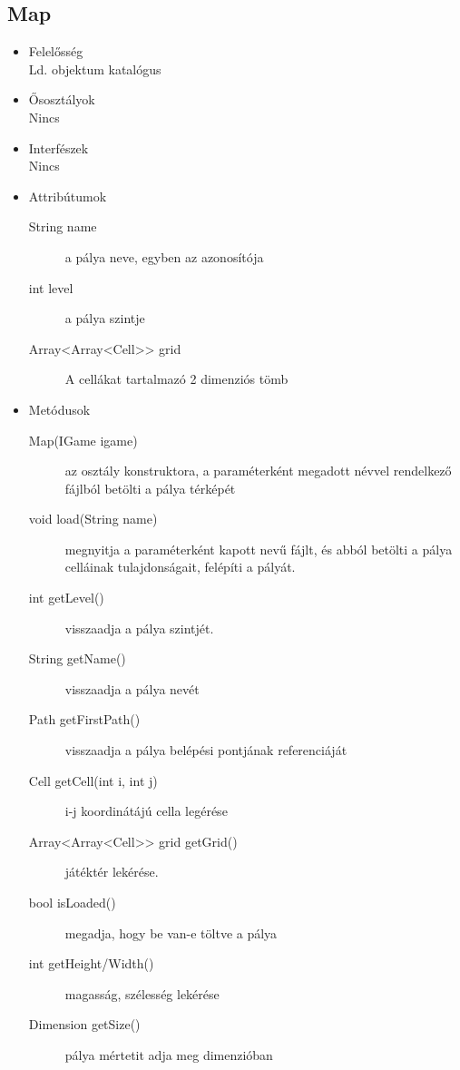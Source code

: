 \subsection{Map}
\begin{itemize}
\item Felelősség\\
Ld. objektum katalógus
\item Ősosztályok\\
Nincs
\item Interfészek\\
Nincs
\item Attribútumok\\
	\begin{description}
		\item[String name] a pálya neve, egyben az azonosítója
		\item[int level] a pálya szintje
		\item[Array<Array<Cell>> grid] A cellákat tartalmazó 2 dimenziós tömb

		
	\end{description}
\item Metódusok\\
	\begin{description}
		
		\item[Map(IGame igame)] az osztály konstruktora, a paraméterként megadott névvel rendelkező fájlból betölti a pálya térképét
\item[void load(String name)] megnyitja a paraméterként kapott nevű fájlt, és abból betölti a pálya celláinak tulajdonságait, felépíti a pályát.
\item[int getLevel()] visszaadja a pálya szintjét.
\item[String getName()] visszaadja a pálya nevét
\item[Path getFirstPath()] visszaadja a pálya belépési pontjának referenciáját
\item[Cell getCell(int i, int j)] i-j koordinátájú cella legérése
\item[Array<Array<Cell>> grid getGrid()] játéktér lekérése.
\item[bool isLoaded()] megadja, hogy be van-e töltve a pálya
\item[int getHeight/Width()] magasság, szélesség lekérése
\item[Dimension getSize()] pálya mértetit adja meg dimenzióban


		
		
	\end{description}
\end{itemize}
